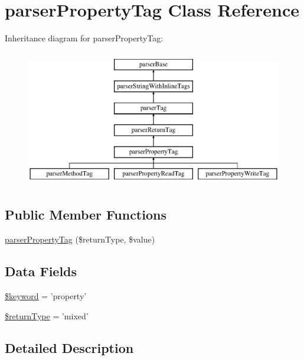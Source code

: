 \hypertarget{classparser_property_tag}{\section{parser\-Property\-Tag \-Class \-Reference}
\label{classparser_property_tag}
}
\-Inheritance diagram for parser\-Property\-Tag\-:\begin{figure}[H]
\begin{center}
\leavevmode
\includegraphics[height=6.000000cm]{classparser_property_tag}
\end{center}
\end{figure}
\subsection*{\-Public \-Member \-Functions}
\begin{DoxyCompactItemize}
\item 
\hyperlink{classparser_property_tag_a70cb8b3e6e1dc839bafa23493944beb9}{parser\-Property\-Tag} (\$return\-Type, \$value)
\end{DoxyCompactItemize}
\subsection*{\-Data \-Fields}
\begin{DoxyCompactItemize}
\item 
\hyperlink{classparser_property_tag_a4a925d6b38bcf3957c713a7d3dc7da1f}{\$keyword} = 'property'
\item 
\hyperlink{classparser_property_tag_a0f317c2c1d4c617554890223a39037be}{\$return\-Type} = 'mixed'
\end{DoxyCompactItemize}


\subsection{\-Detailed \-Description}


